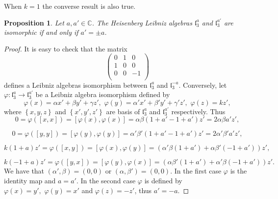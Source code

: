 \documentclass[english,4paper,10pt]{article}
\newtheorem{prop}[thm]{Proposition}
\begin{document}
When $k=1$ the converse result is also true.

\begin{prop}
	Let $a,a'\in\mathbb{C}$. The Heisenberg Leibniz algebras $\mathfrak{l}_3^a$ and $\mathfrak{l}_3^{a'}$ are isomorphic if and only if $a'=\pm a$.
\end{prop}

\begin{proof}
	It is easy to check that the matrix
	 $$
	\begin{pmatrix}
		0 & 1 & 0 \\
		1 & 0 & 0 \\
		0 & 0 & -1 \\
	\end{pmatrix}
	$$
	defines a Leibniz algebras isomorphism between $\mathfrak{l}_3^a$ and $\mathfrak{l}_3^{-a}$. Conversely, let $\varphi \colon \mathfrak{l}_3^a\rightarrow \mathfrak{l}_3^{a'}$ be a Leibniz algebra isomorphism defined by 
	$$
	\varphi(x)=\alpha x'+\beta y'+\gamma z',\,\, \varphi(y)=\alpha' x'+\beta' y'+\gamma' z',\,\, \varphi(z)=kz',
	$$
	where $\left\{x,y,z\right\}$ and $\left\{x',y',z'\right\}$ are basis of $\mathfrak{l}_3^a$ and $\mathfrak{l}_3^{a'}$ respectively. Thus
	\begin{equation*}
		0=\varphi(\left[x,x\right])=\left[\varphi(x),\varphi(x)\right]=\alpha\beta\left( 1+a'-1+
		a' \right)z'=2\alpha\beta a'z',
	\end{equation*}
	
	\begin{equation*}
		0=\varphi(\left[y,y\right])=\left[\varphi(y),\varphi(y)\right]=\alpha'\beta'\left( 1+a'-1+
		a' \right)z'=2\alpha'\beta' a'z',
	\end{equation*}
	
	\begin{equation*}
		k\left(1+a\right)z'=\varphi(\left[x,y\right])=\left[\varphi(x),\varphi(y)\right]=\left( \alpha'\beta\left(1+a'\right)+\alpha\beta'\left(-1+a'\right)\right)z',
	\end{equation*}
	
	\begin{equation*}
		k\left(-1+a\right)z'=\varphi(\left[y,x\right])=\left[\varphi(y),\varphi(x)\right]=\left( \alpha\beta'\left(1+a'\right)+\alpha'\beta\left(-1+a'\right)\right)z'.
	\end{equation*}
	We have that $\left(\alpha',\beta\right)=(0,0)$ or $\left(\alpha,\beta'\right)=(0,0)$. In the first case $\varphi$ is the identity map and $a=a'$. In the second case $\varphi$ is defined by $\varphi(x)=y',\,\, \varphi(y)=x'$ and $\varphi(z)=-z'$, thus $a'=-a$.
\end{proof}
\end{document}

